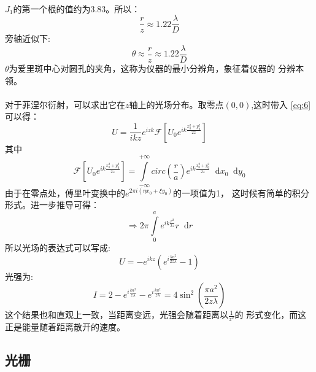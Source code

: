\documentclass{article}
\newcommand*{\dif}{\mathop{}\!\mathrm{d}}
\begin{document}
\paragraph{}
$J_1$的第一个根的值约为3.83。所以：
\[\frac{r}{z}\approx 1.22 \frac{\lambda}{D}\]
旁轴近似下:
\[\theta\approx \frac{r}{z}\approx 1.22 \frac{\lambda}{D}\]
$\theta$为爱里斑中心对圆孔的夹角，这称为仪器的最小分辨角，象征着仪器的
分辨本领。
\paragraph{}
对于菲涅尔衍射，可以求出它在$z$轴上的光场分布。取零点$(0,0)$,这时带入
\ref{eq:6}可以得：
\[U=\frac{1}{ikz}e^{izk}\mathscr{F}[U_0e^{ik \frac{x_0^2+y_0^2}{2z}}]\]
其中
\[\mathscr{F}[U_0e^{ik
    \frac{x_0^2+y_0^2}{2z}}]=\int\limits_{-\infty}^{+\infty}circ(\frac{r}{a})e^{ik
    \frac{x_0^2+y_0^2}{2z}}\dif x_0\dif y_0\]
由于在零点处，傅里叶变换中的$e^{2\pi i(\eta x_0+\xi y_0)}$的一项值为1，
这时候有简单的积分形式。进一步推导可得：
\[\Rightarrow 2\pi\int\limits_0^ae^{ik \frac{r^2}{2z}}r\dif r\]
所以光场的表达式可以写成:
\[U=-e^{ikz}(e^{i \frac{ka^2}{2z\lambda}}-1)\]
光强为:
\[I=2-e^{i \frac{ka^2}{z\lambda}}-e^{i
    \frac{ka^2}{z\lambda}}=4\sin^2(\frac{\pi a^2}{2z\lambda})\]
这个结果也和直观上一致，当距离变远，光强会随着距离以$\frac{1}{z^2}$的
形式变化，而这正是能量随着距离散开的速度。
\subsection{光栅}
\end{document}
